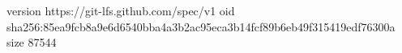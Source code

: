 version https://git-lfs.github.com/spec/v1
oid sha256:85ea9fcb8a9e6d6540bba4a3b2ac95eca3b14fcf89b6eb49f315419edf76300a
size 87544
